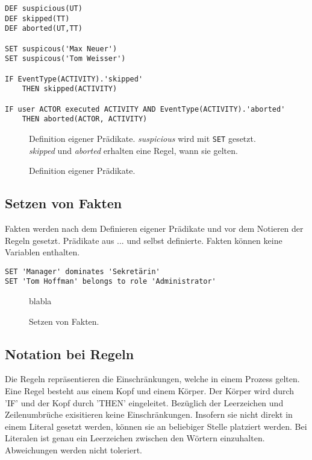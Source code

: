\begin{verbatim}
DEF suspicious(UT)
DEF skipped(TT)
DEF aborted(UT,TT)

SET suspicous('Max Neuer')
SET suspicous('Tom Weisser')

IF EventType(ACTIVITY).'skipped' 
    THEN skipped(ACTIVITY)

IF user ACTOR executed ACTIVITY AND EventType(ACTIVITY).'aborted' 
    THEN aborted(ACTOR, ACTIVITY)
\end{verbatim}
\begin{figure}[!h]
\small Definition eigener Prädikate. \textit{suspicious} wird mit \texttt{SET} gesetzt. \textit{skipped} und \textit{aborted} erhalten eine Regel, wann sie gelten.
\caption{Definition eigener Prädikate.}
\label{fig:define}
\end{figure}

\subsection{Setzen von Fakten}
\label{sec:set}
Fakten werden nach dem Definieren eigener Prädikate und vor dem Notieren der Regeln gesetzt. Prädikate aus ... und selbst definierte.
Fakten können keine Variablen enthalten.

\begin{verbatim}
SET 'Manager' dominates 'Sekretärin'
SET 'Tom Hoffman' belongs to role 'Administrator' 
\end{verbatim}
\begin{figure}[!h]
\small blabla
\caption{Setzen von Fakten.}
\label{fig:define}
\end{figure}


\subsection{Notation bei Regeln}
\label{sec:rules}
Die Regeln repräsentieren die Einschränkungen, welche in einem Prozess gelten. Eine Regel besteht aus einem Kopf und einem Körper. Der Körper wird durch 'IF' und der Kopf durch 'THEN' eingeleitet. Bezüglich der Leerzeichen und Zeilenumbrüche exisitieren keine Einschränkungen. Insofern sie nicht direkt in einem Literal gesetzt werden, können sie an beliebiger Stelle platziert werden. Bei Literalen ist genau ein Leerzeichen zwischen den Wörtern einzuhalten. Abweichungen werden nicht toleriert.

